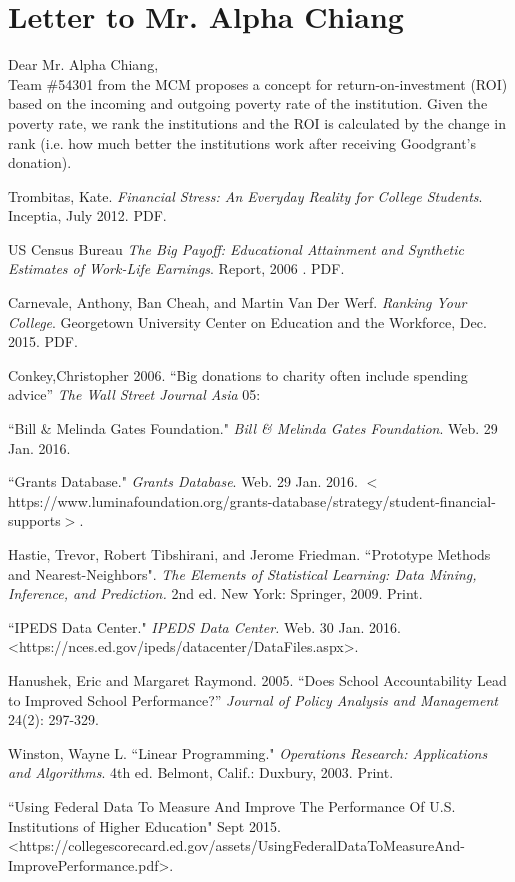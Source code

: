 \documentclass[12pt]{scrartcl}
\begin{document}
\section{Letter to Mr. Alpha Chiang}
Dear Mr. Alpha Chiang, \\

Team \#54301 from the MCM proposes  a concept for return-on-investment (ROI) based on the incoming and outgoing poverty rate of the institution. Given the poverty rate, we rank the institutions and the ROI is calculated by the change in rank (i.e. how much better the institutions work after receiving Goodgrant's donation). 


\newpage



\begin{thebibliography}{10}
	 Trombitas, Kate.  \emph{Financial Stress: An Everyday Reality for College Students}. Inceptia, July 2012. PDF.
	
	 US Census Bureau  \emph{The Big Payoff: Educational Attainment and Synthetic Estimates of Work-Life Earnings}. Report, 2006 . PDF. 

	 Carnevale, Anthony, Ban Cheah, and Martin Van Der Werf. \emph{Ranking Your College}. Georgetown University Center on Education and the Workforce, Dec. 2015. PDF.
	
	 Conkey,Christopher 2006. ``Big donations to charity often include spending advice” \emph{The Wall Street Journal Asia} 05:
	
	 ``Bill \& Melinda Gates Foundation." \emph{Bill \& Melinda Gates Foundation}. Web. 29 Jan. 2016. 
	
	 ``Grants Database." \emph{Grants Database}. Web. 29 Jan. 2016. $<$https://www.luminafoundation.org/grants-database/strategy/student-financial-supports$>$. 

	 Hastie, Trevor, Robert Tibshirani, and Jerome Friedman. ``Prototype Methods and Nearest-Neighbors". \emph{The Elements of Statistical Learning: Data Mining, Inference, and Prediction.} 2nd ed. New York: Springer, 2009. Print. 

	 ``IPEDS Data Center." \emph{IPEDS Data Center.} Web. 30 Jan. 2016. \textless https://nces.ed.gov/ipeds/datacenter/DataFiles.aspx\textgreater.

	 Hanushek, Eric and Margaret Raymond. 2005. ``Does School Accountability Lead to Improved School Performance?” \emph{Journal of Policy Analysis and Management} 24(2): 297-329.
	
	 Winston, Wayne L. ``Linear Programming."  \emph{Operations Research: Applications and Algorithms}. 4th ed. Belmont, Calif.: Duxbury, 2003. Print.
	
	 ``Using Federal Data To Measure And Improve The Performance Of U.S. Institutions of Higher Education" Sept 2015. \textless https://collegescorecard.ed.gov/assets/UsingFederalDataToMeasureAnd- \\ImprovePerformance.pdf\textgreater.
\end{thebibliography}
\end{document}
